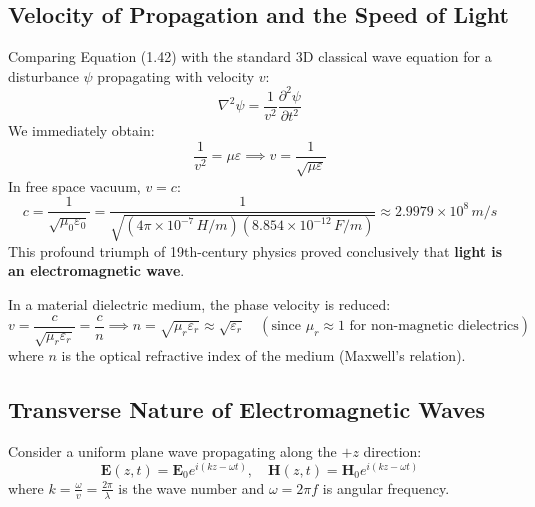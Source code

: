 \subsection{Velocity of Propagation and the Speed of Light}
Comparing Equation (1.42) with the standard 3D classical wave equation for a disturbance $\psi$ propagating with velocity $v$:
\begin{equation}
    \nabla^2 \psi = \frac{1}{v^2} \frac{\partial^2 \psi}{\partial t^2}
\end{equation}
We immediately obtain:
\begin{equation}
    \frac{1}{v^2} = \mu \varepsilon \implies v = \frac{1}{\sqrt{\mu \varepsilon}}
\end{equation}
In free space vacuum, $v = c$:
\begin{equation}
    c = \frac{1}{\sqrt{\mu_0 \varepsilon_0}} = \frac{1}{\sqrt{(4\pi \times 10^{-7}\,\si{H/m})(8.854 \times 10^{-12}\,\si{F/m})}} \approx 2.9979 \times 10^8\,\si{m/s}
\end{equation}
This profound triumph of 19th-century physics proved conclusively that \textbf{light is an electromagnetic wave}.

In a material dielectric medium, the phase velocity is reduced:
\begin{equation}
    v = \frac{c}{\sqrt{\mu_r \varepsilon_r}} = \frac{c}{n} \implies n = \sqrt{\mu_r \varepsilon_r} \approx \sqrt{\varepsilon_r} \quad (\text{since } \mu_r \approx 1 \text{ for non-magnetic dielectrics})
\end{equation}
where $n$ is the optical refractive index of the medium (Maxwell's relation).

\subsection{Transverse Nature of Electromagnetic Waves}
Consider a uniform plane wave propagating along the $+z$ direction:
\begin{equation}
    \mathbf{E}(z, t) = \mathbf{E}_0 e^{i(kz - \omega t)}, \quad \mathbf{H}(z, t) = \mathbf{H}_0 e^{i(kz - \omega t)}
\end{equation}
where $k = \frac{\omega}{v} = \frac{2\pi}{\lambda}$ is the wave number and $\omega = 2\pi f$ is angular frequency.

